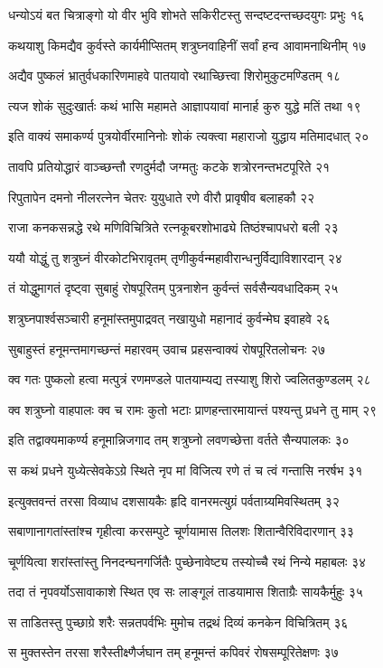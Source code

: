 धन्योऽयं बत चित्राङ्गो यो वीर भुवि शोभते
सकिरीटस्तु सन्दष्टदन्तच्छदयुगः प्रभुः १६

कथयाशु किमद्यैव कुर्वस्ते कार्यमीप्सितम्
शत्रुघ्नवाहिनीं सर्वां हन्व आवामनाथिनीम् १७

अद्यैव पुष्कलं भ्रातुर्वधकारिणमाहवे
पातयावो रथाच्छित्त्वा शिरोमुकुटमण्डितम् १८

त्यज शोकं सुदुःखार्तः कथं भासि महामते
आज्ञापयावां मानार्ह कुरु युद्धे मतिं तथा १९

इति वाक्यं समाकर्ण्य पुत्रयोर्वीरमानिनोः
शोकं त्यक्त्वा महाराजो युद्धाय मतिमादधात् २०

तावपि प्रतियोद्धारं वाञ्च्छन्तौ रणदुर्मदौ
जग्मतुः कटके शत्रोरनन्तभटपूरिते २१

रिपुतापेन दमनो नीलरत्नेन चेतरः
युयुधाते रणे वीरौ प्रावृषीव बलाहकौ २२

राजा कनकसन्नद्धे रथे मणिविचित्रिते
रत्नकूबरशोभाढ्ये तिष्ठंश्चापधरो बली २३

ययौ योद्धुं तु शत्रुघ्नं वीरकोटभिरावृतम्
तृणीकुर्वन्महावीरान्धनुर्विद्याविशारदान् २४

तं योद्धुमागतं दृष्ट्वा सुबाहुं रोषपूरितम्
पुत्रनाशेन कुर्वन्तं सर्वसैन्यवधादिकम् २५

शत्रुघ्नपार्श्वसञ्चारी हनूमांस्तमुपाद्रवत्
नखायुधो महानादं कुर्वन्मेघ इवाहवे २६

सुबाहुस्तं हनूमन्तमागच्छन्तं महारवम्
उवाच प्रहसन्वाक्यं रोषपूरितलोचनः २७

क्व गतः पुष्कलो हत्वा मत्पुत्रं रणमण्डले
पातयाम्यद्य तस्याशु शिरो ज्वलितकुण्डलम् २८

क्व शत्रुघ्नो वाहपालः क्व च रामः कुतो भटाः
प्राणहन्तारमायान्तं पश्यन्तु प्रधने तु माम् २९

इति तद्वाक्यमाकर्ण्य हनूमान्निजगाद तम्
शत्रुघ्नो लवणच्छेत्ता वर्तते सैन्यपालकः ३०

स कथं प्रधने युध्येत्सेवकेऽग्रे स्थिते नृप
मां विजित्य रणे तं च त्वं गन्तासि नरर्षभ ३१

इत्युक्तवन्तं तरसा विव्याध दशसायकैः
हृदि वानरमत्युग्रं पर्वताग्र्यमिवस्थितम् ३२

सबाणानागतांस्तांश्च गृहीत्वा करसम्पुटे
चूर्णयामास तिलशः शितान्वैरिविदारणान् ३३

चूर्णयित्वा शरांस्तांस्तु निनदन्घनगर्जितैः
पुच्छेनावेष्ट्य तस्योच्चै रथं निन्ये महाबलः ३४

तदा तं नृपवर्योऽसावाकाशे स्थित एव सः
लाङ्गूलं ताडयामास शिताग्रैः सायकैर्मुहुः ३५

स ताडितस्तु पुच्छाग्रे शरैः सन्नतपर्वभिः
मुमोच तद्रथं दिव्यं कनकेन विचित्रितम् ३६

स मुक्तस्तेन तरसा शरैस्तीक्ष्णैर्जघान तम्
हनूमन्तं कपिवरं रोषसम्पूरितेक्षणः ३७

